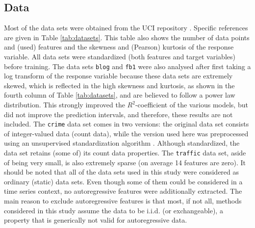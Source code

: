 \documentclass[smallcondensed]{svjour3}
\begin{document}
\subsection{Data}

    Most of the data sets were obtained from the UCI repository \cite{Dua2019}. Specific references are given in Table \ref{tab:datasets}. This table also shows the number of data points and (used) features and the skewness and (Pearson) kurtosis of the response variable. All data sets were standardized (both features and target variables) before training. The data sets \texttt{blog} and \texttt{fb1} were also analysed after first taking a log transform of the response variable because these data sets are extremely skewed, which is reflected in the high skewness and kurtosis, as shown in the fourth column of Table \ref{tab:datasets}, and are believed to follow a power law distribution. This strongly improved the $R^2$-coefficient of the various models, but did not improve the prediction intervals, and therefore, these results are not included. The \texttt{crime} data set comes in two versions: the original data set consists of integer-valued data (count data), while the version used here was preprocessed using an unsupervised standardization algorithm \cite{redmond2002data}. Although standardized, the data set retains (some of) its count data properties. The \texttt{traffic} data set, aside of being very small, is also extremely sparse (on average 14 features are zero). It should be noted that all of the data sets used in this study were considered as ordinary (static) data sets. Even though some of them could be considered in a time series context, no autoregressive features were additionally extracted. The main reason to exclude autoregressive features is that most, if not all, methods considered in this study assume the data to be i.i.d. (or exchangeable), a property that is generically not valid for autoregressive data.
\end{document}

